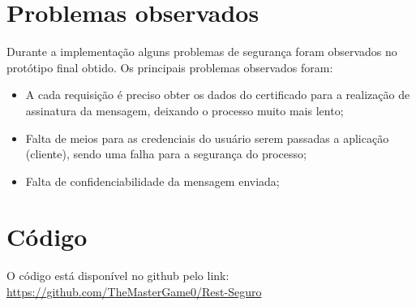 \documentclass[12pt]{article}
\begin{document}
\section{Problemas observados}
Durante a implementação alguns problemas de segurança foram observados no protótipo final obtido. Os principais problemas observados foram:
\begin{itemize}
  \item A cada requisição é preciso obter os dados do certificado para a realização de assinatura da mensagem, deixando o processo muito mais lento;
  \item Falta de meios para as credenciais do usuário serem passadas a aplicação (cliente), sendo uma falha para a segurança do processo;
  \item Falta de confidenciabilidade da mensagem enviada;
\end{itemize}

\section{Código}
O código está disponível no github pelo link: \href{https://github.com/TheMasterGame0/Rest-Seguro}{https://github.com/TheMasterGame0/Rest-Seguro}
\end{document}
